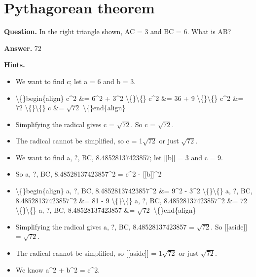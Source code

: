 \documentclass{article}
\begin{document}
\section*{Pythagorean theorem}
\textbf{Question.} In the right triangle shown, AC = 3 and
                BC = 6.
                What is AB?

\textbf{Answer.} 72

\textbf{Hints.}
\begin{itemize}
  \item We want to find c; let a = 6 and b = 3.
  \item \textbackslash\{\}begin\{align\}
                    c\textasciicircum{}2 \&= 6\textasciicircum{}2 + 3\textasciicircum{}2 \textbackslash\{\}\textbackslash\{\}
                    c\textasciicircum{}2 \&= 36 + 9 \textbackslash\{\}\textbackslash\{\}
                    c\textasciicircum{}2 \&= 72 \textbackslash\{\}\textbackslash\{\}
                    c \&= $\sqrt{72}$
                    \textbackslash\{\}end\{align\}
  \item Simplifying the radical gives c = $\sqrt{72}$.
                    So c = $\sqrt{72}$.
  \item The radical cannot be simplified, so c = 1$\sqrt{72}$ or just $\sqrt{72}$.
  \item We want to find a, ?, BC, 8.48528137423857; let [[b]] = 3 and c = 9.
  \item So a, ?, BC, 8.48528137423857\textasciicircum{}2 = c\textasciicircum{}2 - [[b]]\textasciicircum{}2
  \item \textbackslash\{\}begin\{align\}
                    a, ?, BC, 8.48528137423857\textasciicircum{}2 \&= 9\textasciicircum{}2 - 3\textasciicircum{}2 \textbackslash\{\}\textbackslash\{\}
                    a, ?, BC, 8.48528137423857\textasciicircum{}2 \&= 81 - 9 \textbackslash\{\}\textbackslash\{\}
                    a, ?, BC, 8.48528137423857\textasciicircum{}2 \&= 72 \textbackslash\{\}\textbackslash\{\}
                    a, ?, BC, 8.48528137423857 \&= $\sqrt{72}$
                    \textbackslash\{\}end\{align\}
  \item Simplifying the radical gives a, ?, BC, 8.48528137423857 = $\sqrt{72}$.
                    So [[aside]] = $\sqrt{72}$.
  \item The radical cannot be simplified, so [[aside]] = 1$\sqrt{72}$ or just $\sqrt{72}$.
  \item We know a\textasciicircum{}2 + b\textasciicircum{}2 = c\textasciicircum{}2.
\end{itemize}
\end{document}
